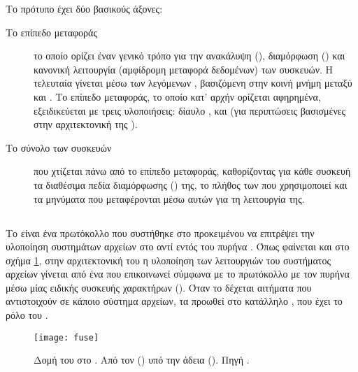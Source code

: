 Το πρότυπο έχει δύο βασικούς άξονες:
\begin{description}
    \item[Το επίπεδο μεταφοράς] το οποίο ορίζει έναν γενικό τρόπο για την
          ανακάλυψη (), διαμόρφωση () και
          κανονική λειτουργία (αμφίδρομη μεταφορά δεδομένων) των συσκευών. Η
          τελευταία γίνεται μέσω των λεγόμενων , βασιζόμενη στην
          κοινή μνήμη μεταξύ \guest{} και . Το επίπεδο μεταφοράς,
          το οποίο κατ' αρχήν ορίζεται αφηρημένα, εξειδικεύεται με τρεις
          υλοποιήσεις: δίαυλο ,  και
           (για περιπτώσεις βασισμένες στην αρχιτεκτονική
           της ).
    \item[Το σύνολο των συσκευών] που χτίζεται πάνω από το επίπεδο μεταφοράς,
          καθορίζοντας για κάθε συσκευή τα διαθέσιμα πεδία διαμόρφωσης
          () της, το πλήθος των  που
          χρησιμοποιεί και τα μηνύματα που μεταφέρονται μέσω αυτών για τη
          λειτουργία της.
\end{description}

\subsection{}

Το  είναι ένα πρωτόκολλο που συστήθηκε στο
\linux{} προκειμένου να επιτρέψει την υλοποίηση συστημάτων αρχείων στο
 αντί εντός του πυρήνα \cite{fuse}.
Όπως φαίνεται και στο σχήμα \ref{fig:fuse}, στην αρχιτεκτονική του η υλοποίηση
των λειτουργιών του συστήματος αρχείων γίνεται από ένα 
που επικοινωνεί σύμφωνα με το πρωτόκολλο με τον πυρήνα μέσω μίας ειδικής
συσκευής χαρακτήρων (\texttt{}). Όταν το  δέχεται
 αιτήματα που αντιστοιχούν σε κάποιο  σύστημα αρχείων, τα
προωθεί στο κατάλληλο , που έχει το ρόλο του .

\begin{figure}
    \centering
    \texttt{[image: fuse]}
    \caption[Δομή του  στο \linux{}]{Δομή του  στο
        \linux{}. Από τον 
        () υπό την άδεια
        ().
        Πηγή
        .}
    \label{fig:fuse}
\end{figure}

